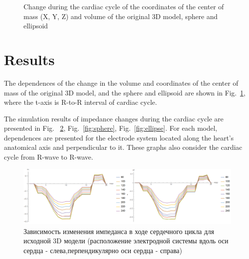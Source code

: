 \documentclass[conference]{IEEEtran}
\begin{document}
\begin{figure}[htbp]
    \caption{Change during the cardiac cycle of the coordinates of the center of mass (X, Y, Z) and volume of the original 3D model, sphere and ellipsoid }
    \label{fig:rxyz}
\end{figure}

\section{Results}

The dependences of the change in the volume and coordinates of the center of
mass of the original 3D model, and the sphere and ellipsoid are shown in
Fig.~\ref{fig:rxyz}, where the t-axis is R-to-R interval of cardiac cycle. 

The simulation results of impedance changes during the cardiac cycle are
presented in Fig. ~\ref{real}, Fig.~\ref{fig:sphere}, Fig.~\ref{fig:ellipse}.
For each model, dependences are presented for the electrode system located along
the heart's anatomical axis and perpendicular to it. These graphs also consider
the cardiac cycle from R-wave to R-wave. 

\begin{figure}[tbph]
    \centering
    \includegraphics[width=\linewidth]{fig/real}
    \caption{Зависимость изменения импеданса в ходе сердечного цикла для исходной 3D модели (расположение электродной системы вдоль оси сердца - слева,перпендикулярно оси сердца - справа)}
    \label{real}
\end{figure}
\end{document}
